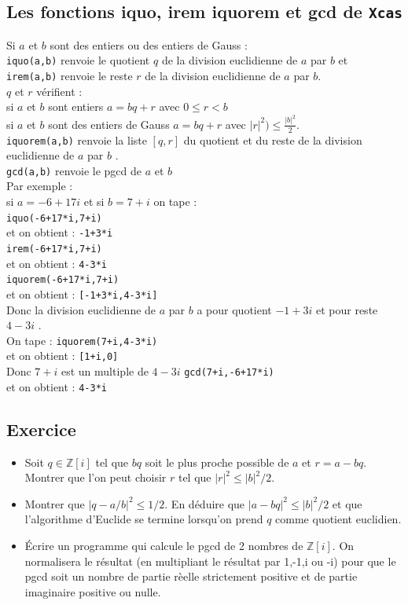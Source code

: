 \documentclass[a4paper,11pt]{book}
\newcommand{\Z}{{\mathbb{Z}}}
\begin{document}
\subsection{Les fonctions iquo, irem iquorem et gcd de {\tt Xcas}}
Si $a$ et $b$ sont des entiers ou des entiers de Gauss :\\
{\tt iquo(a,b)} renvoie le quotient $q$ de la division euclidienne de $a$ par 
$b$ et\\
{\tt irem(a,b)} renvoie le reste $r$ de la division euclidienne de $a$ par 
$b$.\\
$q$ et $r$ v\'erifient :\\
si $a$ et $b$ sont entiers $a=bq+r$ avec $0 \leq r<b$\\
si  $a$ et $b$ sont des entiers de Gauss $a=bq+r$ avec $|r|^2) \leq \frac{|b|^2}{2}$. \\
{\tt iquorem(a,b)} renvoie la liste $[q,r]$ du quotient et du reste de la 
division euclidienne de $a$ par $b$ .\\
{\tt gcd(a,b)} renvoie le pgcd de $a$ et $b$ \\
Par exemple :\\
si $a=-6+17i$ et si $b=7+i$ on tape :\\
{\tt iquo(-6+17*i,7+i)}\\
et on obtient : {\tt -1+3*i}\\
{\tt irem(-6+17*i,7+i)}\\
et on obtient : {\tt 4-3*i}\\
{\tt iquorem(-6+17*i,7+i)}\\
et on obtient : {\tt [-1+3*i,4-3*i]}\\
 Donc la 
division euclidienne de $a$ par $b$ a pour quotient $-1+3i$ et pour reste 
$4-3i$ .\\
On tape : {\tt iquorem(7+i,4-3*i)}\\
et on obtient : {\tt [1+i,0]}\\
Donc $7+i$ est un multiple de $4-3i$
{\tt gcd(7+i,-6+17*i)}\\
et on obtient : {\tt 4-3*i}\\
\subsection{Exercice}
\begin{itemize}
\item Soit $q\in \Z[i]$ tel que $bq$ soit le plus proche 
possible de $a$ et $r=a-bq$.\\
Montrer que l'on peut choisir $r$ tel que 
$|r|^2 \leq |b|^2/2$.\\
\item Montrer que $|q-a/b|^2 \leq 1/2$. En d\'eduire que $|a-bq|^2 \leq |b|^2/2$
et que l'algorithme d'Euclide se termine lorsqu'on prend $q$ comme quotient 
euclidien.
\item \'Ecrire un programme qui calcule le pgcd de 2 nombres de $\Z[i]$. On 
normalisera le r\'esultat (en  multipliant le r\'esultat par 1,-1,i ou -i)
pour que le pgcd soit un nombre de partie r\`eelle 
strictement positive et de partie imaginaire positive ou nulle.
\end{itemize}
\end{document}
